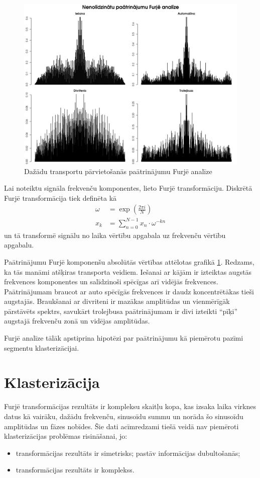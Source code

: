 \documentclass{ludis}
\begin{document}
\begin{figure}
  \centering
  \includegraphics[scale=0.5]{img/fourier_analysis}
  \caption{Dažādu transportu pārvietošanās paātrinājumu Furjē analīze}
  \label{fig:fourier_analysis}
\end{figure}

Lai noteiktu signāla frekvenču komponentes, lieto Furjē transformāciju. Diskrētā Furjē transformācija
tiek definēta kā 
\begin{align*}
  \omega &= \exp \left (\frac{2 \pi i}{N} \right)\\
  x_k &= \sum_{n = 0}^{N - 1} x_n \cdot \omega^{-kn}
\end{align*}
un tā transformē signālu no laika vērtību apgabala uz frekvenču vērtību apgabalu.

Paātrinājumu Furjē komponenšu absolūtās vērtības attēlotas 
grafikā \ref{fig:fourier_analysis}. Redzams, ka tās manāmi atšķiras transporta veidiem. Iešanai ar
kājām ir izteiktas augstās frekvences kompo\-nentes un salīdzinoši spēcīgas arī vidējās frekvences.
Paātrinājumam braucot ar auto spēcīgās frekvences ir daudz koncentrētākas tieši augstajās.
Braukšanai ar divriteni ir mazākas ampli\-tūdas un vienmērīgāk pārstāvēts spektrs, savukārt trolejbusa
paātrinājumam ir divi izteikti ``pīķi'' augstajā frekvenču zonā un vidējas amplitūdas.

Furjē analīze tālāk apstiprina hipotēzi par paātrinājumu kā piemērotu pazīmi segmentu 
klasterizācijai. 

\section{Klasterizācija}
Furjē transformācijas rezultāts ir kompleksu skaitļu kopa, kas izsaka laika virknes datus
kā vairāku, dažādu frekvenču, sinusoīdu summu un norāda šo sinusoīdu amplitūdas un fāzes nobīdes.
Šie dati acīmredzami tiešā veidā nav piemēroti klasterizācijas problēmas risināšanai, jo:
\begin{itemize}
\item transformācijas rezultāts ir simetrisks; pastāv informācijas dubultošanās;
\item transformācijas rezultāts ir komplekss.
\end{itemize}
\end{document}
